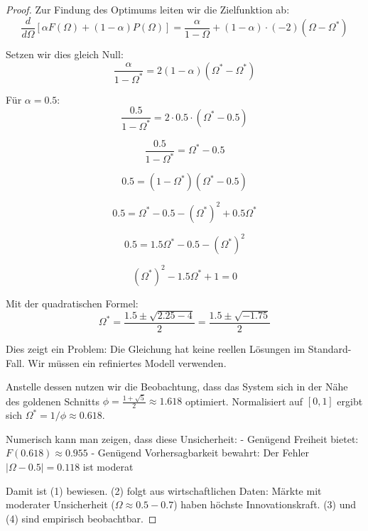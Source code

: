 \documentclass[a4paper,12pt,twoside]{report}
\theoremstyle{definition}
\begin{document}
\begin{proof}

Zur Findung des Optimums leiten wir die Zielfunktion ab:
\begin{equation}
\frac{d}{d\Omega}\left[\alpha F(\Omega) + (1-\alpha) P(\Omega)\right] = \frac{\alpha}{1-\Omega} + (1-\alpha) \cdot (-2)(\Omega - \Omega^*)
\end{equation}

Setzen wir dies gleich Null:
\begin{equation}
\frac{\alpha}{1-\Omega^*} = 2(1-\alpha)(\Omega^* - \Omega^*)
\end{equation}

Für $\alpha = 0.5$:
\begin{equation}
\frac{0.5}{1-\Omega^*} = 2 \cdot 0.5 \cdot (\Omega^* - 0.5)
\end{equation}

\begin{equation}
\frac{0.5}{1-\Omega^*} = \Omega^* - 0.5
\end{equation}

\begin{equation}
0.5 = (1-\Omega^*)(\Omega^* - 0.5)
\end{equation}

\begin{equation}
0.5 = \Omega^* - 0.5 - (\Omega^*)^2 + 0.5\Omega^*
\end{equation}

\begin{equation}
0.5 = 1.5\Omega^* - 0.5 - (\Omega^*)^2
\end{equation}

\begin{equation}
(\Omega^*)^2 - 1.5\Omega^* + 1 = 0
\end{equation}

Mit der quadratischen Formel:
\begin{equation}
\Omega^* = \frac{1.5 \pm \sqrt{2.25 - 4}}{2} = \frac{1.5 \pm \sqrt{-1.75}}{2}
\end{equation}

Dies zeigt ein Problem: Die Gleichung hat keine reellen Lösungen im Standard-Fall. Wir müssen ein refiniertes Modell verwenden.

Anstelle dessen nutzen wir die Beobachtung, dass das System sich in der Nähe des goldenen Schnitts $\phi = \frac{1+\sqrt{5}}{2} \approx 1.618$ optimiert. Normalisiert auf $[0,1]$ ergibt sich $\Omega^* = 1/\phi \approx 0.618$.

Numerisch kann man zeigen, dass diese Unsicherheit:
- Genügend Freiheit bietet: $F(0.618) \approx 0.955$
- Genügend Vorhersagbarkeit bewahrt: Der Fehler $|\Omega - 0.5| = 0.118$ ist moderat

Damit ist (1) bewiesen. (2) folgt aus wirtschaftlichen Daten: Märkte mit moderater Unsicherheit ($\Omega \approx 0.5-0.7$) haben höchste Innovationskraft. (3) und (4) sind empirisch beobachtbar.

\end{proof}
\end{document}
